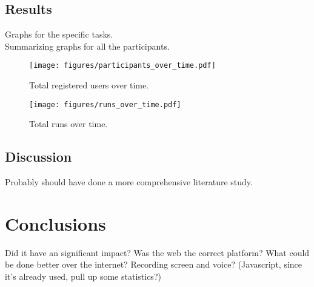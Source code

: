 \documentclass[nofilelist]{cslthse-msc}
\begin{document}
  \section{Results}
    \noindent
    Graphs for the specific tasks. \\
    Summarizing graphs for all the participants.
    \begin{figure}[!h]
      \centering
      \texttt{[image: figures/participants\_over\_time.pdf]}
      \caption{Total registered users over time.}
    \end{figure}
    \begin{figure}[!h]
      \centering
      \texttt{[image: figures/runs\_over\_time.pdf]}
      \caption{Total runs over time.}
    \end{figure}
  \section{Discussion}
    Probably should have done a more comprehensive literature study. \\
\chapter{Conclusions}
  Did it have an significant impact? Was the web the correct platform? What
  could be done better over the internet? Recording screen and voice?
  (Javascript, since it's already used, pull up some statistics?)

{}

\checkoddpage
\ifoddpage
\else
   \newpage
   \thispagestyle{empty}
   \mbox{ }
\fi
%
\end{document}
